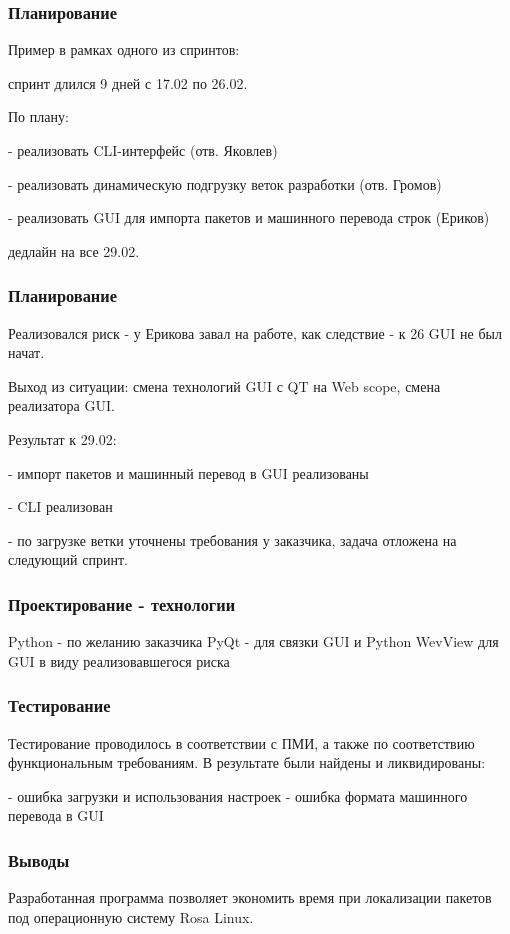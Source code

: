 \documentclass{beamer}
\begin{document}
\begin{frame}
\frametitle{Планирование}

Пример в рамках одного из спринтов:

спринт длился 9 дней с 17.02 по 26.02. 

По плану:

- реализовать CLI-интерфейс (отв. Яковлев)

- реализовать динамическую подгрузку веток разработки (отв. Громов)

- реализовать GUI для импорта пакетов и машинного перевода строк (Ериков)

дедлайн на все 29.02.
\end{frame}
\begin{frame}
\frametitle{Планирование}

Реализовался риск - у Ерикова завал на работе, как следствие - к 26 GUI не был начат.

Выход из ситуации: смена технологий GUI с QT на Web scope, смена реализатора GUI.

Результат к 29.02:

- импорт пакетов и машинный перевод в GUI реализованы 

- CLI реализован

- по загрузке ветки уточнены требования у заказчика, задача отложена на следующий спринт.
\end{frame}

\begin{frame}
\frametitle{Проектирование - технологии}

Python - по желанию заказчика
PyQt - для связки GUI и Python
WevView для GUI в виду реализовавшегося риска
\end{frame}



\begin{frame}
\frametitle{Тестирование}

Тестирование проводилось в соответствии с ПМИ, а также по соответствию функциональным требованиям.
В результате были найдены и ликвидированы:

- ошибка загрузки и использования настроек
- ошибка формата машинного перевода в GUI
\end{frame}



\begin{frame}
	\frametitle{Выводы}
Разработанная программа позволяет экономить время при локализации пакетов под операционную систему Rosa Linux.
\end{frame}
\end{document}
